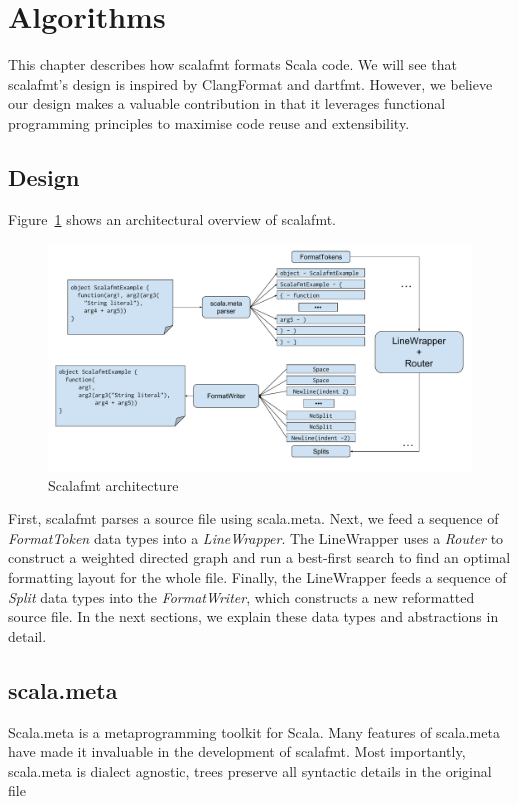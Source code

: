 \section{Algorithms}\label{sec:algorithms}
This chapter describes how scalafmt formats Scala code.
We will see that scalafmt's design is inspired by ClangFormat and dartfmt.
However, we believe our design makes a valuable contribution in that it leverages functional programming principles to maximise code reuse and extensibility.

\subsection{Design}
Figure~\ref{fig:architecture} shows an architectural overview of scalafmt.
\begin{figure}
  \centering
  \includegraphics[width=\textwidth]{img/architechture.pdf}
  \caption{Scalafmt architecture}
  \label{fig:architecture}
\end{figure}
First, scalafmt parses a source file using scala.meta.
Next, we feed a sequence of \emph{FormatToken} data types into a \emph{LineWrapper}.
The LineWrapper uses a \emph{Router} to construct a weighted directed graph and run a best-first search to find an optimal formatting layout for the whole file.
Finally, the LineWrapper feeds a sequence of \emph{Split} data types into the \emph{FormatWriter}, which constructs a new reformatted source file.
In the next sections, we explain these data types and abstractions in detail.

\subsection{scala.meta}
Scala.meta\autocite{scala57:online} is a metaprogramming toolkit for Scala.
Many features of scala.meta have made it invaluable in the development of scalafmt.
Most importantly, scala.meta is dialect agnostic, trees preserve all syntactic details in the original file



